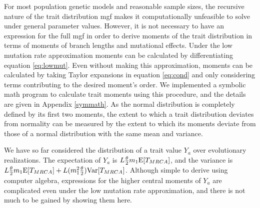 \newcommand{\AAA}{\E[\mathbbm{T}_{4,4}] + \frac{1}{3}\E[\mathbbm{T}_{3,4}] + \frac{2}{9}\E[\mathbbm{T}_{2,4}]}
\newcommand{\BBB}{\frac{1}{9}\E[\mathbbm{T}_{2,4}] + \frac{1}{6}\E[\mathbbm{T}_{3,4}]}
\newcommand{\CCC}{\E[\mathbbm{T}_{4,4}] - \frac{1}{6}\E[\mathbbm{T}_{3,4}] - \frac{1}{9}\E[\mathbbm{T}_{2,4}]}

For most population genetic models and reasonable sample sizes, the recursive
nature of the trait distribution mgf makes it computationally unfeasible to
solve under general parameter values. However, it is not necessary to have an
expression for the full mgf in order to derive moments of the trait distribution
in terms of moments of branch lengths and mutational effects. Under the low
mutation rate approximation moments can be calculated by differentiating
equation \eqref{eq:lowmut}. Even without making this approximation, moments can
be calculated by taking Taylor expansions in equation \eqref{eq:cond} and only
considering terms contributing to the desired moment's order. We implemented a
symbolic math program to calculate trait moments using this procedure, and the
details are given in Appendix \ref{symmath}. As the normal distribution is
completely defined by its first two moments, the extent to which a trait
distribution deviates from normality can be measured by the extent to which its
moments deviate from those of a normal distribution with the same mean and
variance.

We have so far considered the distribution of a trait value $Y_a$ over
evolutionary realizations. The expectation of $Y_a$ is $L \frac{\theta}{2} m_1 \mathrm{E}[T_{MRCA}]$,
and the variance is $L \frac{\theta}{2} m_1 \mathrm{E}[T_{MRCA}] + L(m_1^2\frac{\theta}{2})\mathrm{Var}[T_{MRCA}]$. Although
simple to derive using computer algebra, expressions for the higher central
moments of $Y_a$ are complicated even under the low mutation rate approximation,
and there is not much to be gained by showing them here.

